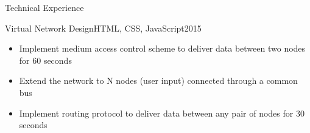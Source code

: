 \documentclass[]{mcdowellcv}
\begin{document}
\begin{cvsection}{Technical Experience}
\begin{cvsubsection}{Virtual Network Design}{HTML, CSS, JavaScript}{2015}
\begin{itemize}
            	\item Implement medium access control scheme to deliver data between two nodes for 60 seconds
                \item Extend the network to N nodes (user input) connected through a common bus
                \item Implement routing protocol to deliver data between any pair of nodes for 30 seconds
            
            \end{itemize}
        	
        \end{cvsubsection}
    
    \end{cvsection}
	
\end{document}
